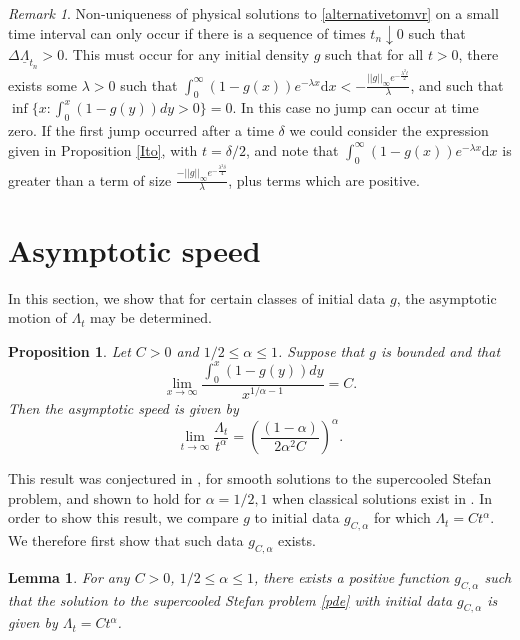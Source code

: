 \documentclass[11pt]{article}
\theoremstyle{plain}
\newtheorem{lemma}[theorem]{Lemma}
\newtheorem{proposition}[theorem]{Proposition}
\theoremstyle{remark}
\newtheorem{remark}[theorem]{Remark}
\theoremstyle{definition}
\numberwithin{equation}{section}
\begin{document}
\begin{remark}
 Non-uniqueness of physical solutions to \eqref{alternativetomvr} on a small time interval can only occur if there is a sequence of times $t_n\downarrow 0$ such that $\Delta \underline{\Lambda}_{t_n}>0.$ This must occur for any initial density $g$ such that for all $t>0$, there exists some $\lambda>0$ such that $ \int_0^\infty (1-g(x))e^{-\lambda x}\textrm{d}x<-\frac{||g||_\infty e^{-\frac{\lambda^2t}{2}}}{\lambda}$, and such that $\inf\{x:\int_0^x(1-g(y))dy>0\}=0$. In this case no jump can occur at time zero. If the first jump occurred after a time $\delta$ we could consider the expression given in Proposition \ref{Ito}, with $t=\delta/2$, and note that $\int_0^\infty (1-g(x))e^{-\lambda x}\textrm{d}x$ is greater than a term of size $\frac{-||g||_\infty e^{-\frac{\lambda^2 \delta}{4}}}{\lambda}$, plus terms which are positive.
\end{remark}

\section{Asymptotic speed}
\label{asymptoticsection}

In this section, we show that for certain classes of initial data $g$, the asymptotic motion of $\Lambda_t$ may be determined. 
\begin{proposition}
\label{nontravelling}
    Let $C>0$ and $1/2\leq \alpha\leq 1$. Suppose that $g$ is bounded and that 
    $$\lim_{x\rightarrow\infty}\frac{\int_0^x(1-g(y))dy}{ x^{1/\alpha-1}}=C.$$
    Then the asymptotic speed is given by $$\lim_{t\rightarrow\infty }\frac{\Lambda_t}{t^{\alpha}}=\left(\frac{(1-\alpha)}{2\alpha^2C}\right)^{\alpha}.$$
\end{proposition}

This result was conjectured in \cite[Section 4]{4}, for smooth solutions to the supercooled Stefan problem, and shown to hold for $\alpha=1/2,1$ when classical solutions exist in \cite{Ricci_Weiqing_1991}. In order to show this result, we compare $g$ to initial data $g_{C,\alpha}$ for which $\Lambda_t=Ct^\alpha$. We therefore first show that such data $g_{C,\alpha}$ exists. 

\begin{lemma}
    For any $C>0$, $1/2\leq \alpha\leq 1$, there exists a positive function $g_{C,\alpha}$ such that the solution to the supercooled Stefan problem \eqref{pde} with initial data $g_{C,\alpha}$ is given by $\Lambda_t=Ct^{\alpha}$.
\end{lemma}
\end{document}
